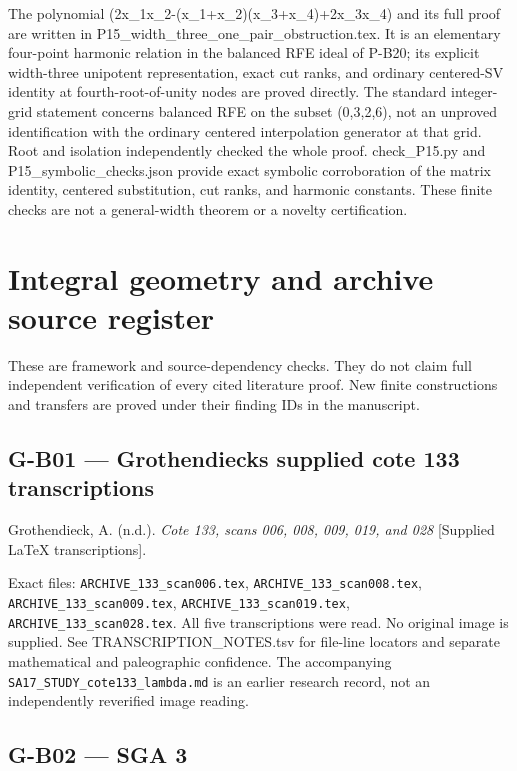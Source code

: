 \documentclass[11pt,a4paper]{article}
\theoremstyle{definition}\newtheorem{definition}{Definition}
\begin{document}
The polynomial (2x\_1x\_2-(x\_1+x\_2)(x\_3+x\_4)+2x\_3x\_4) and its full
proof are written in P15\_width\_three\_one\_pair\_obstruction.tex. It
is an elementary four-point harmonic relation in the balanced RFE ideal
of P-B20; its explicit width-three unipotent representation, exact cut
ranks, and ordinary centered-SV identity at fourth-root-of-unity nodes
are proved directly. The standard integer-grid statement concerns
balanced RFE on the subset (0,3,2,6), not an unproved identification
with the ordinary centered interpolation generator at that grid. Root
and isolation independently checked the whole proof. check\_P15.py and
P15\_symbolic\_checks.json provide exact symbolic corroboration of the
matrix identity, centered substitution, cut ranks, and harmonic
constants. These finite checks are not a general-width theorem or a
novelty certification.
\section{Integral geometry and archive source
register}\label{integral-geometry-and-archive-source-register}

These are framework and source-dependency checks. They do not claim full
independent verification of every cited literature proof. New finite
constructions and transfers are proved under their finding IDs in the
manuscript.

\subsection{G-B01 --- Grothendieck\textquotesingle s supplied cote 133
transcriptions}\label{g-b01--grothendiecks-supplied-cote-133-transcriptions}

Grothendieck, A. (n.d.). \emph{Cote 133, scans 006, 008, 009, 019, and
028} {[}Supplied LaTeX transcriptions{]}.

Exact files: \nolinkurl{ARCHIVE_133_scan006.tex},
\nolinkurl{ARCHIVE_133_scan008.tex}, \nolinkurl{ARCHIVE_133_scan009.tex},
\nolinkurl{ARCHIVE_133_scan019.tex}, \nolinkurl{ARCHIVE_133_scan028.tex}.
All five transcriptions were read. No original image is supplied. See
TRANSCRIPTION\_NOTES.tsv for file-line locators and separate
mathematical and paleographic confidence. The accompanying
\nolinkurl{SA17_STUDY_cote133_lambda.md} is an earlier research record,
not an independently reverified image reading.

\subsection{G-B02 --- SGA 3}\label{g-b02--sga-3}
\end{document}
